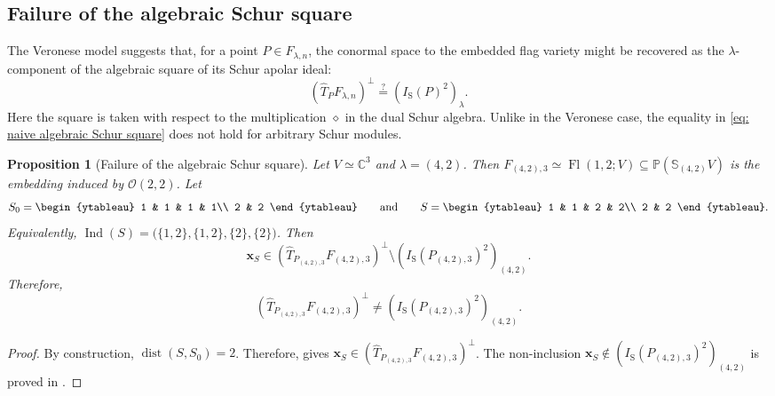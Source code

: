 \documentclass[a4paper,reqno]{amsart}
\theoremstyle{plainnopunct}
\newtheorem{proposition}[proposition]{Proposition}
\theoremstyle{definitionnopunct}
\newcommand{\C}{\mathbb{C}}
\renewcommand{\P}{\mathbb{P}}
\renewcommand{\S}{\mathbb{S}}
\newcommand{\cO}{\mathcal{O}}
\newcommand{\ind}{\operatorname{Ind}}
\newcommand{\dist}{\operatorname{dist}}
\newcommand{\bx}{\mathbf{x}}
\DeclareMathOperator{\Fl}{Fl}
\begin{document}
\subsection{Failure of the algebraic Schur square}
\label{subsect: failure algebraic Schur square}

The Veronese model suggests that, for a point $P\in F_{\lambda,n}$, the conormal space to the embedded flag variety might be recovered as the $\lambda$-component of the algebraic square of its Schur apolar ideal:
\begin{equation}
\label{eq: naive algebraic Schur square}
\left(
\widehat T_PF_{\lambda,n}
\right)^\perp
\stackrel{?}{=}
\left(
I_{\mathrm S}(P)^2
\right)_\lambda.
\end{equation}
Here the square is taken with respect to the multiplication $\diamond$ in the dual Schur algebra. Unlike in the Veronese case, the equality in \eqref{eq: naive algebraic Schur square} does not hold for arbitrary Schur modules.

\begin{proposition}[Failure of the algebraic Schur square]
\label{prop: algebraic Schur square fails}
Let $V\simeq\C^3$ and $\lambda=(4,2)$. Then $F_{(4,2),3}
\simeq
\Fl(1,2;V)
\subseteq
\P(\S_{(4,2)}V)$ is the embedding induced by $\cO(2,2)$. Let
\[
S_0
=
\begin{ytableau}
1 & 1 & 1 & 1\\
2 & 2
\end{ytableau}
\qquad\text{and}\qquad
S
=
\begin{ytableau}
1 & 1 & 2 & 2\\
2 & 2
\end{ytableau}.
\]
Equivalently, $ \ind(S) = \bigl( \{1,2\}, \{1,2\}, \{2\}, \{2\} \bigr)$. Then
\[\bx_S
\in
\left(
\widehat T_{P_{(4,2),3}}F_{(4,2),3}
\right)^\perp
\setminus
\left(
I_{\mathrm S}(P_{(4,2),3})^2
\right)_{(4,2)}.
\]
Therefore,
\[
\left(
\widehat T_{P_{(4,2),3}}F_{(4,2),3}
\right)^\perp
\neq
\left(
I_{\mathrm S}(P_{(4,2),3})^2
\right)_{(4,2)}.
\]
\end{proposition}

\begin{proof}
By construction, $\dist(S,S_0)=2$.
Therefore,
 gives $\bx_S
\in
\left(
\widehat T_{P_{(4,2),3}}F_{(4,2),3}
\right)^\perp$.
The non-inclusion $\bx_S \notin \left( I_{\mathrm S}(P_{(4,2),3})^2 \right)_{(4,2)}$ is proved in .
\end{proof}
\end{document}

